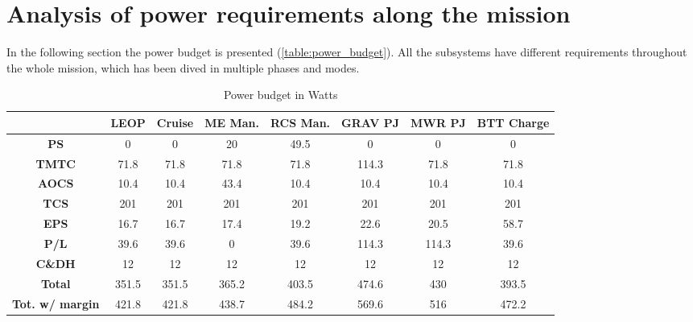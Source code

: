 \section{Analysis of power requirements along the mission}
\label{sec:EPS_phases}

In the following section the power budget is presented (\autoref{table:power_budget}). All the subsystems have different requirements throughout the whole mission, which has been dived in multiple phases and modes. 
\begin{table}[H]
    \renewcommand{\arraystretch}{1.5}
    \centering
    \begin{tabular}{|c|c|c|c|c|c|c|c|}
        \hline
        & \textbf{LEOP} & \textbf{Cruise} & \textbf{ME Man.} & \textbf{RCS Man.} & \textbf{GRAV PJ} & \textbf{MWR PJ} & \textbf{BTT Charge} \\
        \hline
        \hline
        \textbf{PS} & 0 & 0 & 20 & 49.5 & 0 & 0 & 0 \\
        \hline
        \textbf{TMTC} & 71.8 & 71.8 & 71.8 & 71.8 & 114.3 & 71.8 & 71.8 \\
        \hline
        \textbf{AOCS} & 10.4 & 10.4 & 43.4 & 10.4 & 10.4 & 10.4 & 10.4 \\
        \hline
        \textbf{TCS} & 201 & 201 & 201 & 201 & 201 & 201 & 201 \\
        \hline
        \textbf{EPS} & 16.7 & 16.7 & 17.4 & 19.2 & 22.6 & 20.5 & 58.7 \\
        \hline
        \textbf{P/L} & 39.6 & 39.6 & 0 & 39.6 & 114.3 & 114.3 & 39.6 \\
        \hline
        \textbf{C\&DH} & 12 & 12 & 12 & 12 & 12 & 12 & 12 \\
        \hline
        \hline
        \textbf{Total} & 351.5 & 351.5 & 365.2 & 403.5 & 474.6 & 430 & 393.5 \\
        \hline
        \textbf{Tot. w/ margin} & 421.8 & 421.8 & 438.7 & 484.2 & 569.6 & 516 & 472.2 \\
        \hline
    \end{tabular}
    \caption{Power budget in Watts}
    \label{table:power_budget}
\end{table}  


